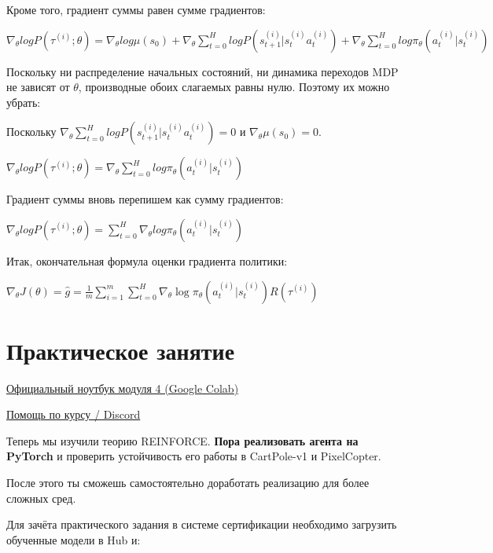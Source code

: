 \documentclass[11pt,a4paper]{article}
\begin{document}
Кроме того, градиент суммы равен сумме градиентов:

\(\nabla_\theta log P(\tau^{(i)};\theta)=\nabla_\theta log\mu(s_0) + \nabla_\theta \sum\limits_{t=0}^{H} log P(s_{t+1}^{(i)}|s_{t}^{(i)} a_{t}^{(i)}) + \nabla_\theta \sum\limits_{t=0}^{H} log \pi_\theta(a_{t}^{(i)}|s_{t}^{(i)})\)

Поскольку ни распределение начальных состояний, ни динамика переходов MDP не зависят от \(\theta\), производные обоих слагаемых равны нулю. Поэтому их можно убрать:

Поскольку \(\nabla_\theta \sum_{t=0}^{H} log P(s_{t+1}^{(i)}|s_{t}^{(i)}  a_{t}^{(i)}) = 0\) и \(\nabla_\theta \mu(s_0) = 0\).

\(\nabla_\theta log P(\tau^{(i)};\theta) =   \nabla_\theta \sum_{t=0}^{H} log \pi_\theta(a_{t}^{(i)}|s_{t}^{(i)})\)

Градиент суммы вновь перепишем как сумму градиентов:

\(\nabla_\theta log P(\tau^{(i)};\theta)=    \sum_{t=0}^{H} \nabla_\theta log \pi_\theta(a_{t}^{(i)}|s_{t}^{(i)})\)

Итак, окончательная формула оценки градиента политики:

\(\nabla_{\theta} J(\theta) = \hat{g} = \frac{1}{m} \sum^{m}_{i=1} \sum^{H}_{t=0} \nabla_\theta \log \pi_\theta(a^{(i)}_{t} | s_{t}^{(i)})R(\tau^{(i)})\)

\section{Практическое занятие}\label{hands-on}

\href{https://colab.research.google.com/github/huggingface/deep-rl-class/blob/main/notebooks/unit4/unit4.ipynb}{Официальный ноутбук модуля 4 (Google Colab)}

\href{http://hf.co/join/discord}{Помощь по курсу / Discord}

Теперь мы изучили теорию REINFORCE. \textbf{Пора реализовать агента на PyTorch} и проверить устойчивость его работы в CartPole-v1 и PixelCopter.

После этого ты сможешь самостоятельно доработать реализацию для более сложных сред.


Для зачёта практического задания в системе сертификации необходимо загрузить обученные модели в Hub и:
\end{document}
